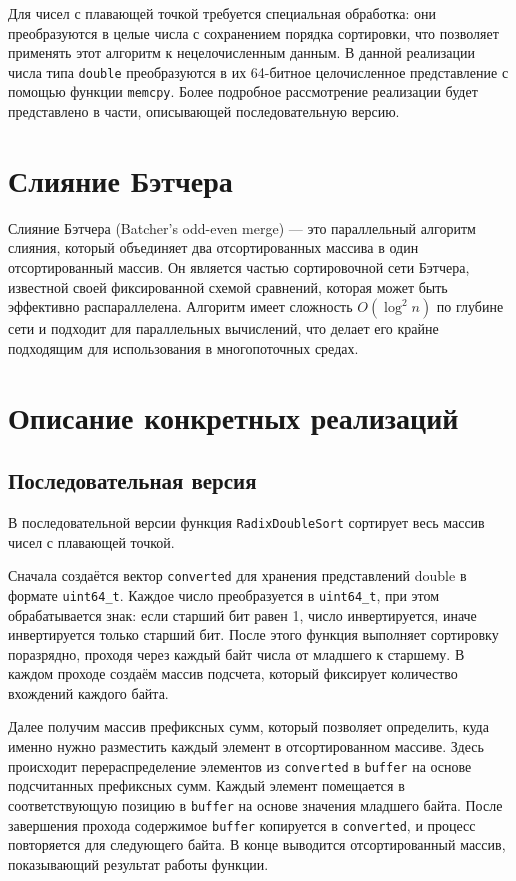 \documentclass[12pt,a4paper]{extarticle}
\begin{document}
	Для чисел с плавающей точкой требуется специальная обработка: они преобразуются в целые числа с сохранением порядка сортировки, что позволяет применять этот алгоритм к нецелочисленным данным. В данной реализации числа типа \texttt{double} преобразуются в их 64-битное целочисленное представление с помощью функции \texttt{memcpy}. Более подробное рассмотрение реализации будет представлено в части, описывающей последовательную версию.	

	

	\section{Слияние Бэтчера}
	Слияние Бэтчера (Batcher’s odd-even merge) — это параллельный алгоритм слияния, который объединяет два отсортированных массива в один отсортированный массив. Он является частью сортировочной сети Бэтчера, известной своей фиксированной схемой сравнений, которая может быть эффективно распараллелена. Алгоритм имеет сложность $O(\log^2n)$ по глубине сети и подходит для параллельных вычислений, что делает его крайне подходящим для использования в многопоточных средах.

	
	
	\section{Описание конкретных реализаций}
	
	\subsection{Последовательная версия}
	В последовательной версии функция \texttt{RadixDoubleSort} сортирует весь массив чисел с плавающей точкой.
		
	Сначала создаётся вектор \texttt{converted} для хранения представлений double в формате \texttt{uint64\_t}. Каждое число преобразуется в \texttt{uint64\_t}, при этом обрабатывается знак: если старший бит равен 1, число инвертируется, иначе инвертируется только старший бит. 
	После этого функция выполняет сортировку поразрядно, проходя через каждый байт числа от младшего к старшему. В каждом проходе создаём массив подсчета, который фиксирует количество вхождений каждого байта.
	
	Далее получим массив префиксных сумм, который позволяет определить, куда именно нужно разместить каждый элемент в отсортированном массиве. Здесь происходит перераспределение элементов из \texttt{converted} в \texttt{buffer} на основе подсчитанных префиксных сумм. Каждый элемент помещается в соответствующую позицию в \texttt{buffer} на основе значения младшего байта. После завершения прохода содержимое \texttt{buffer} копируется в \texttt{converted}, и процесс повторяется для следующего байта. В конце выводится отсортированный массив, показывающий результат работы функции.
	
\end{document}
